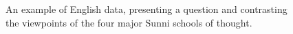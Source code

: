 \documentclass[letterpaper]{article}
\begin{document}
\begin{figure}
\begin{tcolorbox}[colback=black!10, boxrule=0pt]
{%




   
}
    \end{tcolorbox} 
    \caption{An example of English data, presenting a question and contrasting the viewpoints of the four major Sunni schools of thought.}
    \label{fig:example-question}
\end{figure}
\end{document}
